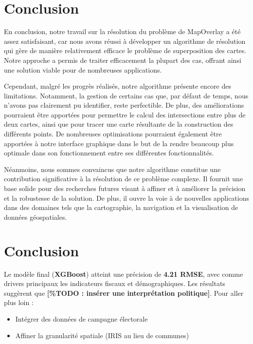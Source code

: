 \clearpage
\section*{Conclusion}


En conclusion, notre travail sur la résolution du problème de MapOverlay a été assez satisfaisant, car nous avons réussi à développer un algorithme de résolution qui gère de manière relativement efficace le problème de superposition des cartes. Notre approche a permis de traiter efficacement la plupart des cas, offrant ainsi une solution viable pour de nombreuses applications.

Cependant, malgré les progrès réalisés, notre algorithme présente encore des limitations. Notamment, la gestion de certains cas que, par défaut de temps, nous n'avons pas clairement pu identifier, reste perfectible. De plus, des améliorations pourraient être apportées pour permettre le calcul des intersections entre plus de deux cartes, ainsi que pour tracer une carte résultante de la construction des différents points. De nombreuses optimisations pourraient également être apportées à notre interface graphique dans le but de la rendre beaucoup plus optimale dans son fonctionnement entre ses différentes fonctionnalités.

Néanmoins, nous sommes convaincus que notre algorithme constitue une contribution significative à la résolution de ce problème complexe. Il fournit une base solide pour des recherches futures visant à affiner et à améliorer la précision et la robustesse de la solution. De plus, il ouvre la voie à de nouvelles applications dans des domaines tels que la cartographie, la navigation et la visualisation de données géospatiales.








\section{Conclusion}
Le modèle final (\textbf{XGBoost}) atteint une précision de \textbf{4.21 RMSE}, avec comme drivers principaux les indicateurs fiscaux et démographiques. Les résultats suggèrent que \textbf{[\%TODO : insérer une interprétation politique]}. Pour aller plus loin :
\begin{itemize}
    \item Intégrer des données de campagne électorale
    \item Affiner la granularité spatiale (IRIS au lieu de communes)
\end{itemize}

